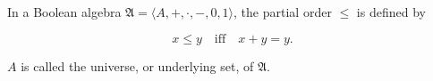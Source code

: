 In a Boolean algebra $\mathfrak{A} = \langle A, +, \cdot, -, 0, 1 \rangle$, the partial order $\leq$ is defined by

$$x \leq y \quad \text{iff} \quad x + y = y.$$

$A$ is called the universe, or underlying set, of $\mathfrak{A}$.
